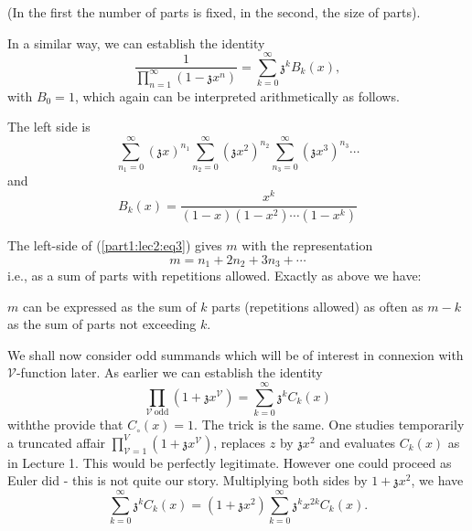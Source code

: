 (In the first the number of parts is fixed, in the second, the size of
parts).

In a similar way, we can establish the identity
\begin{equation*}
  \frac{1}{\prod_{n=1}^\infty (1- \mathfrak{z}x^n)} =
  \sum_{k=0}^\infty \mathfrak{z}^k B_k (x), \tag{3}\label{part1:lec2:eq3}
\end{equation*}
with $B_0=1$, which again can be interpreted arithmetically as
follows. 

The left side is 
\begin{equation*}
\sum\limits_{n_1=0}^\infty (\mathfrak{z}x)^{n_1}
  \sum\limits_{n_2=0}^\infty  (\mathfrak{z} x^2)^{n_2}
  \sum\limits_{n_3=0}^\infty (\mathfrak{z}x^3)^{n_3} \cdots 
\end{equation*}
and
\begin{equation*}
  B_k(x) = \frac{x^k}{(1-x)(1-x^2) \cdots (1-x^k)}\tag{4}\label{part1:lec2:eq4}
\end{equation*}

The left-side of (\ref{part1:lec2:eq3}) gives $m$ with the representation
$$
m=n_1 + 2n_2 + 3n_3+ \cdots
$$
i.e., as a sum of parts with repetitions allowed. Exactly as above we
have:

\begin{thm}\label{part1:lec2:thm3}
  $m$ can be expressed as the sum of $k$ parts (repetitions allowed)
  as often as $m-k$ as the sum of parts not exceeding $k$.
\end{thm}

We shall now consider odd summands which will be of interest in
connexion with $\mathcal{V}$-function later. As earlier we can
establish the identity
\begin{equation*}
  \prod_{\mathcal{V}~\text{odd}} (1+ \mathfrak{z} x^{\mathcal{V}}) =
  \sum_{k=0}^\infty \mathfrak{z}^k C_k(x) \tag{5}\label{part1:lec2:eq5}
\end{equation*}
with\pageoriginale  the provide that $C_\circ (x)=1$. The trick is the same. One
studies temporarily a truncated affair
$\prod\limits_{\mathcal{V}=1}^V(1+ \mathfrak{z} x^{\mathcal{V}})$,
replaces $z$ by $\mathfrak{z}x^2$ and evaluates $C_k(x)$ as in Lecture
1. This would be perfectly legitimate. However one could proceed as
Euler did - this is not quite our story. Multiplying both sides by $1+
\mathfrak{z}x^2$, we have
$$
\sum\limits^\infty_{k=0} \mathfrak{z}^k C_k (x) = (1+\mathfrak{z}x^2)
\sum\limits^\infty_{k=0} \mathfrak{z}^k x^{2k} C_k (x).
$$

